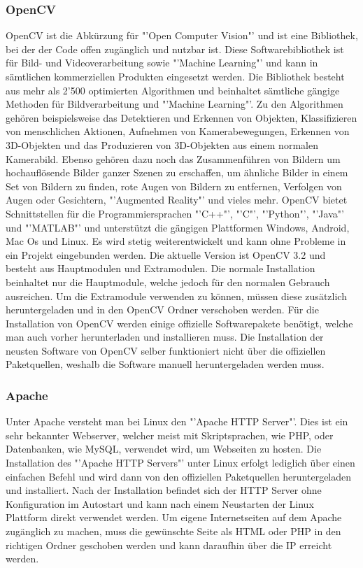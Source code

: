 \subsubsection{OpenCV}
OpenCV ist die Abkürzung für "'Open Computer Vision"' und ist eine Bibliothek, bei der der Code offen zugänglich und nutzbar ist. Diese Softwarebibliothek ist für Bild- und Videoverarbeitung sowie "'Machine Learning"' und kann in sämtlichen kommerziellen Produkten eingesetzt werden. Die Bibliothek besteht aus mehr als 2'500 optimierten Algorithmen und beinhaltet sämtliche gängige Methoden für Bildverarbeitung und "'Machine Learning"'. Zu den Algorithmen gehören beispielsweise das Detektieren und Erkennen von Objekten, Klassifizieren von menschlichen Aktionen, Aufnehmen von Kamerabewegungen, Erkennen von 3D-Objekten und das Produzieren von 3D-Objekten aus einem normalen Kamerabild. Ebenso gehören dazu noch das Zusammenführen von Bildern um hochauflösende Bilder ganzer Szenen zu erschaffen, um ähnliche Bilder in einem Set von Bildern zu finden, rote Augen von Bildern zu entfernen, Verfolgen von Augen oder Gesichtern, "'Augmented Reality"' und vieles mehr. OpenCV bietet Schnittstellen für die Programmiersprachen "'C++"', "'C"', "'Python"', "'Java"' und "'MATLAB"' und unterstützt die gängigen Plattformen Windows, Android, Mac Os und Linux. Es wird stetig weiterentwickelt und kann ohne Probleme in ein Projekt eingebunden werden. Die aktuelle Version ist OpenCV 3.2 und besteht aus Hauptmodulen und Extramodulen. Die normale Installation beinhaltet nur die Hauptmodule, welche jedoch für den normalen Gebrauch ausreichen. Um die Extramodule verwenden zu können, müssen diese zusätzlich heruntergeladen und in den OpenCV Ordner verschoben werden. Für die Installation von OpenCV werden einige offizielle Softwarepakete benötigt, welche man auch vorher herunterladen und installieren muss. Die Installation der neusten Software von OpenCV selber funktioniert nicht über die offiziellen Paketquellen, weshalb die Software manuell heruntergeladen werden muss. \cite{OpenCV}

\subsubsection{Apache}
Unter Apache versteht man bei Linux den "'Apache HTTP Server"'. Dies ist ein sehr bekannter Webserver, welcher meist mit Skriptsprachen, wie PHP, oder Datenbanken, wie MySQL, verwendet wird, um Webseiten zu hosten. Die Installation des "'Apache HTTP Servers"' unter Linux erfolgt lediglich über einen einfachen Befehl und wird dann von den offiziellen Paketquellen heruntergeladen und installiert. Nach der Installation befindet sich der HTTP Server ohne Konfiguration im Autostart und kann nach einem Neustarten der Linux Plattform direkt verwendet werden. Um eigene Internetseiten auf dem Apache zugänglich zu machen, muss die gewünschte Seite als HTML oder PHP in den richtigen Ordner geschoben werden und kann daraufhin über die IP erreicht werden. \cite{Apache}
